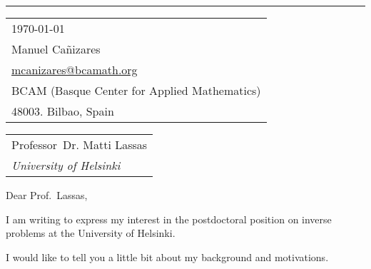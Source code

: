 \documentclass{article}
\begin{document}


\vspace{-1em} %

\rule{\linewidth}{1pt} %



\hfill
\begin{tabular}{l @{}}
\hfill \today \bigskip\\ %
\hfill Manuel Ca\~{n}izares \\
\hfill \href{mailto:mcanizares@bcamath.org}{mcanizares@bcamath.org}\\
\hfill BCAM (Basque Center for Applied Mathematics)\\
\hfill 48003. Bilbao, Spain \\ %
\end{tabular}

\bigskip %


\begin{tabular}{@{} l}
	Professor\ Dr. Matti Lassas\\
		\textit{University of Helsinki}
\end{tabular}

\bigskip %

Dear Prof.\ Lassas,

\bigskip %


I am writing to express my interest in the postdoctoral position on inverse problems at the University of Helsinki.

I would like to tell you a little bit about my background and motivations. 
\end{document}
